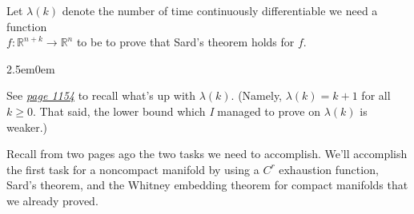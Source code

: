 \documentclass{book}
\newcommand{\inLinkRap}[2]{{\color{blue}\hyperlink{#1}{\textit{#2}}}}
\newcommand{\hTwo}{%
\color{Black}%
   \fontsize{13}{15}\selectfont%
}
\newcommand{\myComment}{%
   \color{RawerSienna}%
   \fontsize{12}{14}\selectfont%
}
\newenvironment{myIndent}{%
   \begin{adjustwidth}{2.5em}{0em}%
}{%
   \end{adjustwidth}%
}
\newcommand{\retTwo}{\hfill\bigbreak}
\begin{document}
\hTwo Let $\lambda(k)$ denote the number of time continuously differentiable we need a function\\ $f: \mathbb{R}^{n + k} \to \mathbb{R}^n$ to be to prove that Sard's theorem holds for $f$.
\begin{myIndent}\myComment
	See \inLinkRap{Page 1154 reference}{page 1154} to recall what's up with $\lambda(k)$. (Namely, $\lambda(k) = k + 1$ for all $k \geq 0$. That said, the lower bound which \textit{I} managed to prove on $\lambda(k)$ is weaker.)\retTwo
\end{myIndent}

Recall from two pages ago the two tasks we need to accomplish. We'll accomplish the first task for a noncompact manifold by using a $C^r$ exhaustion function, Sard's theorem, and the Whitney embedding theorem for compact manifolds that we already proved.\retTwo
\end{document}

